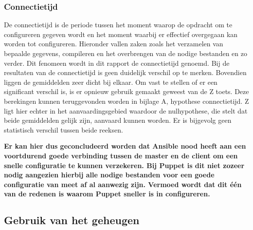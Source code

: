 \subsubsection{Connectietijd}

De \gls{connectietijd} is de periode tussen het moment waarop de opdracht om te configureren gegeven wordt en het moment waarbij er effectief overgegaan kan worden tot configureren. Hieronder vallen zaken zoals het verzamelen van bepaalde gegevens, compileren en het overbrengen van de nodige bestanden en zo verder. Dit fenomeen wordt in dit rapport de \gls{connectietijd} genoemd. Bij de resultaten van de connectietijd is geen duidelijk verschil op te merken. Bovendien liggen de gemiddelden zeer dicht bij elkaar. Om vast te stellen of er een significant verschil is, is er opnieuw gebruik gemaakt geweest van de Z toets. Deze berekingen kunnen teruggevonden worden in bijlage A, hypothese connectietijd. Z ligt hier echter in het aanvaardingsgebied waardoor de nulhypothese, die stelt dat beide gemiddelden gelijk zijn, aanvaard kunnen worden. Er is bijgevolg geen statistisch verschil tussen beide reeksen.

\textbf{Er kan hier dus geconcludeerd worden dat Ansible nood heeft aan een voortdurend goede verbinding tussen de master en de client om een snelle configuratie te kunnen verzekeren. Bij Puppet is dit niet zozeer nodig aangezien hierbij alle nodige bestanden voor een goede configuratie van meet af al aanwezig zijn. Vermoed wordt dat dit \'e\'en van de redenen is waarom Puppet sneller is in configureren.}






\subsection{Gebruik van het geheugen}

